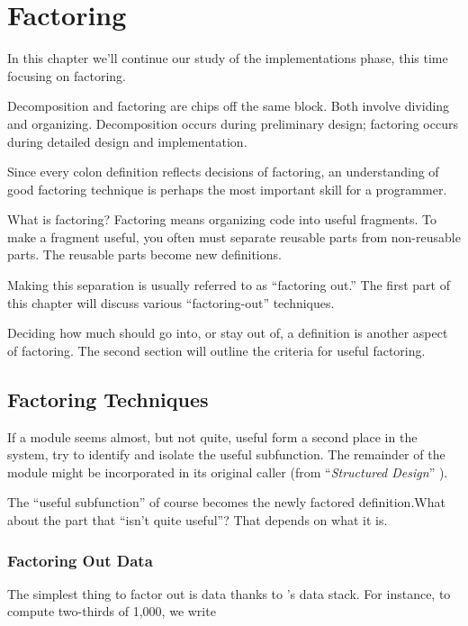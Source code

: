 
\chapter{Factoring}

In this chapter we'll continue our study of the implementations phase,
this time focusing on factoring.

Decomposition and factoring are chips off the same block. Both involve
dividing and organizing. Decomposition occurs during preliminary
design; factoring occurs during detailed design and implementation.

Since every colon definition reflects decisions of factoring, an
understanding of good factoring technique is perhaps the most
important skill for a \Forth{} programmer.

What is factoring? Factoring means organizing code into useful
fragments. To make a fragment useful, you often must separate reusable
parts from non-reusable parts. The reusable parts become new
definitions.

Making this separation is usually referred to as ``factoring out.''
The first part of this chapter will discuss various ``factoring-out''
techniques.

Deciding how much should go into, or stay out of, a definition is
another aspect of factoring. The second section will outline the
criteria for useful factoring.

\section{Factoring Techniques}

\begin{tfquot}
If a module seems almost, but not quite, useful form a second place in
the system, try to identify and isolate the useful subfunction. The
remainder of the module might be incorporated in its original caller
(from ``\emph{Structured Design}'' \cite{stevens74-6}).
\end{tfquot}
The ``useful subfunction'' of course becomes the newly factored
definition.What about the part that ``isn't quite useful''? That
depends on what it is.

\subsection{{Factoring Out Data}}
The simplest thing to factor out is data thanks to \Forth{}'s data
stack. For instance, to compute two-thirds of 1,000, we write

